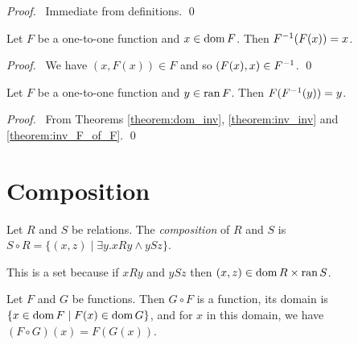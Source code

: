 \begin{proof}
    \pf\ Immediate from definitions. \qed
\end{proof}

\begin{theorem}
    \label{theorem:inv_F_of_F}
    Let $F$ be a one-to-one function and $x \in \operatorname{dom} F$. Then ${F}^{-1}(F(x)) = x$.
\end{theorem}

\begin{proof}
    \pf\ We have $(x, F(x)) \in F$ and so $(F(x), x) \in {F}^{-1}$. \qed
\end{proof}

\begin{theorem}
    Let $F$ be a one-to-one function and $y \in \operatorname{ran} F$. Then $F({F}^{-1}(y)) = y$.
\end{theorem}

\begin{proof}
    \pf\ From Theorems \ref{theorem:dom_inv}, \ref{theorem:inv_inv} and \ref{theorem:inv_F_of_F}. \qed
\end{proof}

\section{Composition}

\begin{definition}
    Let $R$ and $S$ be relations. The \emph{composition} of $R$ and $S$ is $S \circ R = \{ (x,z) \mid \exists y. xRy \wedge ySz \}$.
    
    This is a set because if $xRy$ and $ySz$ then $(x,z) \in \operatorname{dom} R \times \operatorname{ran} S$.
\end{definition}

\begin{theorem}
    \label{theorem:comp_function}
    Let $F$ and $G$ be functions. Then $G \circ F$ is a function, its domain
    is $\{ x \in \operatorname{dom} F \mid F(x) \in \operatorname{dom} G \}$, and for $x$ in this domain,
    we have $(F \circ G)(x) = F(G(x))$.
\end{theorem}


